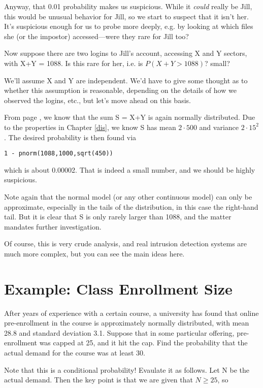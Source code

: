 Anyway, that 0.01 probability makes us suspicious.  While it {\it could}
really be Jill, this would be unusual behavior for Jill, so we start to
suspect that it isn't her.  It's suspicious enough for us to probe more
deeply, e.g. by looking at which files she (or the impostor)
accessed---were they rare for Jill too?

Now suppose there are two logins to Jill's account, accessing X and Y
sectors, with X+Y = 1088.  Is this rare for her, i.e. is $P(X+Y >
1088)$? small? 

We'll assume X and Y are independent.  We'd have to give some thought as
to whether this assumption is reasonable, depending on the details of
how we observed the logins, etc., but let's move ahead on this basis.

From page \pageref{sumindep}, we know that the sum S = X+Y is again normally
distributed.  Due to the properties in Chapter \ref{dis}, we know S has
mean $2 \cdot 500$ and variance $2 \cdot 15^2$.  The desired
probability is then found via

\begin{lstlisting}
1 - pnorm(1088,1000,sqrt(450))
\end{lstlisting}

which is about 0.00002.  That is indeed a small number, and we should be
highly suspicious.

Note again that the normal model (or any other continuous model) can
only be approximate, especially in the tails of the distribution, in
this case the right-hand tail.  But it is clear that S is only rarely
larger than 1088, and the matter mandates further investigation.

Of course, this is very crude analysis, and real intrusion detection
systems are much more complex, but you can see the main ideas here.

\section{Example:  Class Enrollment Size}
\label{classize}

After years of experience with a certain course, a university has found
that online pre-enrollment in the course is approximately normally
distributed, with mean 28.8 and standard deviation 3.1.  Suppose that in
some particular offering, pre-enrollment was capped at 25, and it hit
the cap.  Find the probability that the actual demand for the course was
at least 30.

Note that this is a conditional probability!  Evaulate it as follows.
Let N be the actual demand.  Then the key point is that we are given that
$N \geq 25$, so

